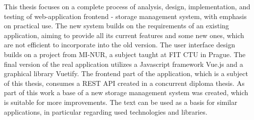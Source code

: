 This thesis focuses on a complete process of analysis, design, implementation, and testing of web-application frontend - storage management system, with emphasis on practical use. The new system builds on the requirements of an existing application, aiming to provide all its current features and some new ones, which are not efficient to incorporate into the old version. The user interface design builds on a project from MI-NUR, a subject taught at FIT CTU in Prague. The final version of the real application utilizes a Javascript framework Vue.js and a graphical library Vuetify. The frontend part of the application, which is a subject of this thesis, consumes a REST API created in a concurrent diploma thesis. As part of this work a base of a new storage management system was created, which is suitable for more improvements. The text can be used as a basis for similar applications, in particular regarding used technologies and libraries.
